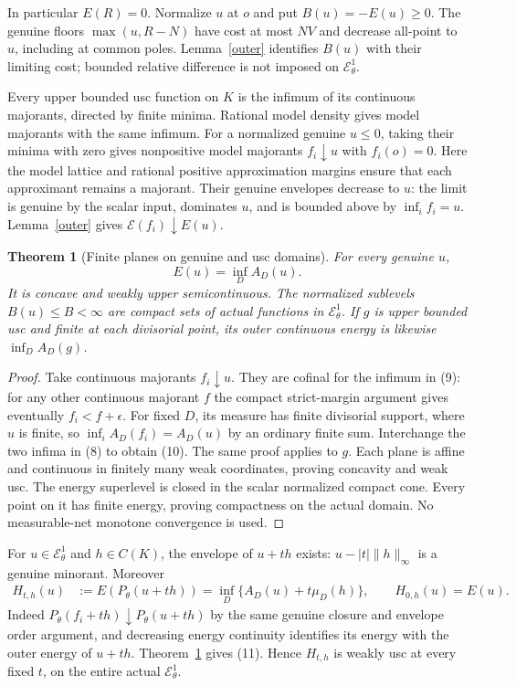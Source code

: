 \documentclass[11pt]{article}
\newtheorem{theorem}{Theorem}
\newcommand{\EE}{\mathcal E^1_\theta}
\begin{document}
In particular $E(R)=0$. Normalize $u$ at $o$ and put
$B(u)=-E(u)\geq0$. The genuine floors $\max(u,R-N)$ have cost
at most $NV$ and decrease all-point to $u$, including at common
poles. Lemma~\ref{outer} identifies $B(u)$ with their limiting
cost; bounded relative difference is not imposed on $\EE$.

Every upper bounded usc function on $K$ is the infimum of its
continuous majorants, directed by finite minima. Rational model
density gives model majorants with the same infimum. For a normalized
genuine $u\leq0$, taking their minima with zero gives nonpositive
model majorants $f_i\downarrow u$ with $f_i(o)=0$.
Here the model lattice and rational positive approximation margins
ensure that each approximant remains a majorant.
Their genuine envelopes decrease to $u$: the limit is genuine by
the scalar input, dominates $u$, and is bounded above by
$\inf_i f_i=u$. Lemma~\ref{outer} gives
$\mathscr E(f_i)\downarrow E(u)$.

\begin{theorem}[Finite planes on genuine and usc domains]\label{planes}
For every genuine $u$,
\[
                         E(u)=\inf_D A_D(u).            \tag{10}
\]
It is concave and weakly upper semicontinuous. The normalized
sublevels $B(u)\leq B<\infty$ are compact sets of actual functions
in $\EE$. If $g$ is upper bounded usc and finite at each divisorial
point, its outer continuous energy is likewise $\inf_D A_D(g)$.
\end{theorem}
\begin{proof}
Take continuous majorants $f_i\downarrow u$. They are cofinal for
the infimum in (9): for any other continuous majorant $f$ the
compact strict-margin argument gives eventually $f_i<f+\epsilon$.
For fixed $D$, its measure has finite divisorial support, where
$u$ is finite, so $\inf_i A_D(f_i)=A_D(u)$ by an ordinary finite
sum. Interchange the two infima in (8) to obtain (10).
The same proof applies to $g$. Each plane is affine and continuous
in finitely many weak coordinates, proving concavity and weak usc.
The energy superlevel is closed in the scalar normalized compact
cone. Every point on it has finite energy, proving compactness on
the actual domain. No measurable-net monotone convergence is used.
\end{proof}

For $u\in\EE$ and $h\in C(K)$, the envelope of $u+th$ exists:
$u-|t|\|h\|_\infty$ is a genuine minorant. Moreover
\[
\begin{split}
 H_{t,h}(u)&:=E(P_\theta(u+th))
       =\inf_D\{A_D(u)+t\mu_D(h)\},\qquad H_{0,h}(u)=E(u).
\end{split}                                             \tag{11}
\]
Indeed $P_\theta(f_i+th)\downarrow P_\theta(u+th)$ by the
same genuine closure and envelope order argument, and decreasing
energy continuity identifies its energy with the outer energy of
$u+th$. Theorem~\ref{planes} gives (11). Hence $H_{t,h}$ is weakly
usc at every fixed $t$, on the entire actual $\EE$.
\end{document}
